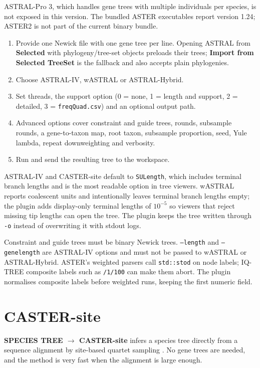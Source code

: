 \documentclass[10pt]{report}
\begin{document}
ASTRAL-Pro 3, which handles gene trees with multiple individuals per species,
is not exposed in this version. The bundled ASTER executables report version
1.24; ASTER2 is not part of the current binary bundle.

\begin{enumerate}
  \item Provide one Newick file with one gene tree per line. Opening ASTRAL
        from \textbf{Selected} with phylogeny/tree-set objects preloads their
        trees; \textbf{Import from Selected TreeSet} is the fallback and also
        accepts plain phylogenies.
  \item Choose ASTRAL-IV, wASTRAL or ASTRAL-Hybrid.
  \item Set threads, the support option (0 = none, 1 = length and support,
        2 = detailed, 3 = \texttt{freqQuad.csv}) and an optional output path.
  \item Advanced options cover constraint and guide trees, rounds, subsample
        rounds, a gene-to-taxon map, root taxon, subsample proportion, seed,
        Yule lambda, repeat downweighting and verbosity.
  \item Run and send the resulting tree to the workspace.
\end{enumerate}

ASTRAL-IV and CASTER-site default to \texttt{SULength}, which includes
terminal branch lengths and is the most readable option in tree viewers.
wASTRAL reports coalescent units and intentionally leaves terminal branch
lengths empty; the plugin adds display-only terminal lengths of $10^{-5}$ so
viewers that reject missing tip lengths can open the tree. The plugin keeps the
tree written through \texttt{-o} instead of overwriting it with stdout logs.

Constraint and guide trees must be binary Newick trees. \texttt{--length} and
\texttt{--genelength} are ASTRAL-IV options and must not be passed to wASTRAL or
ASTRAL-Hybrid. ASTER's weighted parsers call \texttt{std::stod} on node labels;
IQ-TREE composite labels such as \texttt{/1/100} can make them abort. The
plugin normalises composite labels before weighted runs, keeping the first
numeric field.

\section{CASTER-site}

\textbf{SPECIES TREE $\rightarrow$ CASTER-site} infers a species tree directly
from a sequence alignment by site-based quartet sampling \cite{caster}. No gene trees are
needed, and the method is very fast when the alignment is large enough.
\end{document}

